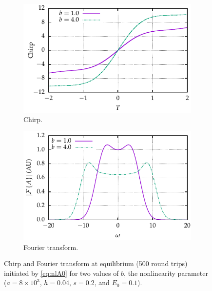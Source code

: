 \documentclass[9pt,twocolumn,twoside]{osajnl}
\begin{document}
\begin{figure}[tbp]
	\centering
	\begin{subfigure}{\columnwidth}
		\centering
		\includegraphics{Figures/Chirp}
		\caption{Chirp.}
		\label{fig:chirp}
	\end{subfigure} %
	\begin{subfigure}{\columnwidth}
		\centering
		\includegraphics{Figures/FT}
		\caption{Fourier transform.}
		\label{fig:ft}
	\end{subfigure}
	\caption{Chirp and Fourier transform at equilibrium (500 round trips) initiated by \eqref{eq:nlA0} for two values of $b$, the nonlinearity parameter ($a = 8 \times 10^3$, $h = 0.04$, $s = 0.2$, and $E_0 = 0.1$).}
	\label{fig:chirpft}
\end{figure}
\end{document}
